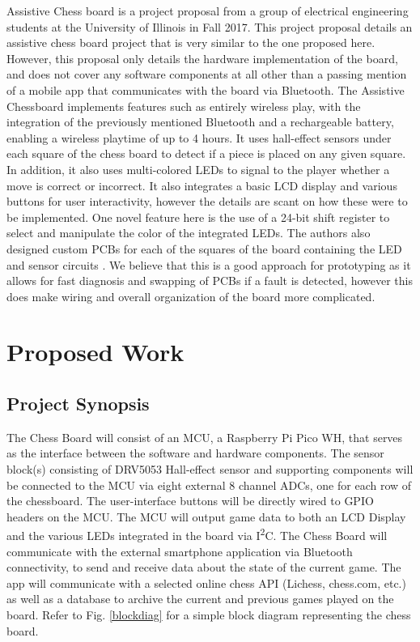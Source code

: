 \documentclass[11pt,journal]{IEEEtran}
\begin{document}
Assistive Chess board is a project proposal from a group of electrical engineering students at the University of Illinois in Fall 2017. This project proposal details an assistive chess board project that is very similar to the one proposed here. However, this proposal only details the hardware implementation of the board, and does not cover any software components at all other than a passing mention of a mobile app that communicates with the board via Bluetooth. The Assistive Chessboard implements features such as entirely wireless play, with the integration of the previously mentioned Bluetooth and a rechargeable battery, enabling a wireless playtime of up to 4 hours. It uses hall-effect sensors under each square of the chess board to detect if a piece is placed on any given square. In addition, it also uses multi-colored LEDs to signal to the player whether a move is correct or incorrect. It also integrates a basic LCD display and various buttons for user interactivity, however the details are scant on how these were to be implemented. One novel feature here is the use of a 24-bit shift register to select and manipulate the color of the integrated LEDs. The authors also designed custom PCBs for each of the squares of the board containing the LED and sensor circuits \cite{assistivechess}. We believe that this is a good approach for prototyping as it allows for fast diagnosis and swapping of PCBs if a fault is detected, however this does make wiring and overall organization of the board more complicated.




\section{Proposed Work}

\subsection{Project Synopsis}
The Chess Board will consist of an MCU, a Raspberry Pi Pico WH, that serves as the interface between the software and hardware components. The sensor block(s) consisting of DRV5053 Hall-effect sensor and supporting components will be connected to the MCU via eight external 8 channel ADCs, one for each row of the chessboard. The user-interface buttons will be directly wired to GPIO headers on the MCU. The MCU will output game data to both an LCD Display and the various LEDs integrated in the board via I\textsuperscript{2}C. The Chess Board will communicate with the external smartphone application via Bluetooth connectivity, to send and receive data about the state of the current game. The app will communicate with a selected online chess API (Lichess, chess.com, etc.) as well as a database to archive the current and previous games played on the board. Refer to Fig. \ref{blockdiag} for a simple block diagram representing the chess board.
\end{document}
